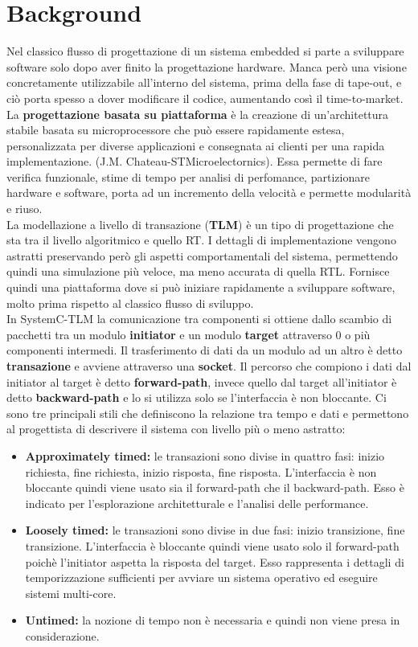\documentclass[]{IEEEtran}
\begin{document}
\section{Background}
Nel classico flusso di progettazione di un sistema embedded si parte a sviluppare software solo dopo aver finito la progettazione hardware. Manca però una visione concretamente utilizzabile all'interno del sistema, prima della fase di tape-out, e ciò porta spesso a dover modificare il codice, aumentando così il time-to-market.
La \textbf{progettazione basata su piattaforma} è la creazione di un'architettura stabile basata su microprocessore che può essere rapidamente estesa, personalizzata per diverse applicazioni e consegnata ai clienti per una rapida implementazione. (J.M. Chateau-STMicroelectornics). Essa permette di fare verifica funzionale, stime di tempo per analisi di perfomance, partizionare hardware e software, porta ad un incremento della velocità e permette modularità e riuso.
\\La modellazione a livello di transazione (\textbf{TLM}) è un tipo di progettazione che sta tra il livello algoritmico e quello RT. I dettagli di implementazione vengono astratti preservando però gli aspetti comportamentali del sistema, permettendo quindi una simulazione più veloce, ma meno accurata di quella RTL. Fornisce quindi una piattaforma dove si può iniziare rapidamente a sviluppare software, molto prima rispetto al classico flusso di sviluppo.
\\In SystemC-TLM la comunicazione tra componenti si ottiene dallo scambio di pacchetti tra un modulo \textbf{initiator} e un modulo \textbf{target} attraverso 0 o più componenti intermedi. Il trasferimento di dati da un modulo ad un altro è detto \textbf{transazione} e avviene attraverso una \textbf{socket}. Il percorso che compiono i dati dal initiator al target è detto \textbf{forward-path}, invece quello dal target all'initiator è detto \textbf{backward-path} e lo si utilizza solo se l'interfaccia è non bloccante. Ci sono tre principali stili che definiscono la relazione tra tempo e dati e permettono al progettista di descrivere il sistema con livello più o meno astratto:
\begin{itemize}
    \item \textbf{Approximately timed: } le transazioni sono divise in quattro fasi: inizio richiesta, fine richiesta, inizio risposta, fine risposta. L'interfaccia è non bloccante quindi viene usato sia il forward-path che il backward-path. Esso è indicato per l'esplorazione architetturale e l'analisi delle performance.
    \item \textbf{Loosely timed: } le transazioni sono divise in due fasi: inizio transizione, fine transizione. L'interfaccia è bloccante quindi viene usato solo il forward-path poichè l'initiator aspetta la risposta del target. Esso rappresenta i dettagli di temporizzazione sufficienti per avviare un sistema operativo ed eseguire sistemi multi-core.
    \item \textbf{Untimed: } la nozione di tempo non è necessaria e quindi non viene presa in considerazione.
\end{itemize}
\end{document}
